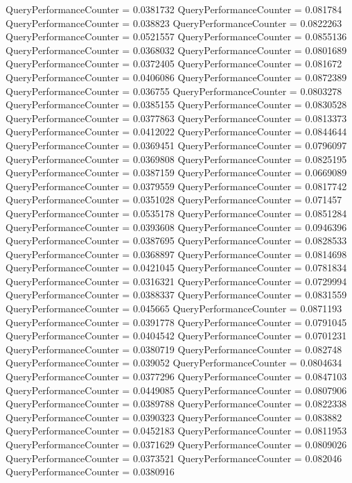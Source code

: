 \documentclass[9pt]{article}
\theoremstyle{plain}
\theoremstyle{definition}
\theoremstyle{remark}
\numberwithin{equation}{section}
\begin{document}
QueryPerformanceCounter  =  0.0381732
QueryPerformanceCounter  =  0.081784
QueryPerformanceCounter  =  0.038823
QueryPerformanceCounter  =  0.0822263
QueryPerformanceCounter  =  0.0521557
QueryPerformanceCounter  =  0.0855136
QueryPerformanceCounter  =  0.0368032
QueryPerformanceCounter  =  0.0801689
QueryPerformanceCounter  =  0.0372405
QueryPerformanceCounter  =  0.081672
QueryPerformanceCounter  =  0.0406086
QueryPerformanceCounter  =  0.0872389
QueryPerformanceCounter  =  0.036755
QueryPerformanceCounter  =  0.0803278
QueryPerformanceCounter  =  0.0385155
QueryPerformanceCounter  =  0.0830528
QueryPerformanceCounter  =  0.0377863
QueryPerformanceCounter  =  0.0813373
QueryPerformanceCounter  =  0.0412022
QueryPerformanceCounter  =  0.0844644
QueryPerformanceCounter  =  0.0369451
QueryPerformanceCounter  =  0.0796097
QueryPerformanceCounter  =  0.0369808
QueryPerformanceCounter  =  0.0825195
QueryPerformanceCounter  =  0.0387159
QueryPerformanceCounter  =  0.0669089
QueryPerformanceCounter  =  0.0379559
QueryPerformanceCounter  =  0.0817742
QueryPerformanceCounter  =  0.0351028
QueryPerformanceCounter  =  0.071457
QueryPerformanceCounter  =  0.0535178
QueryPerformanceCounter  =  0.0851284
QueryPerformanceCounter  =  0.0393608
QueryPerformanceCounter  =  0.0946396
QueryPerformanceCounter  =  0.0387695
QueryPerformanceCounter  =  0.0828533
QueryPerformanceCounter  =  0.0368897
QueryPerformanceCounter  =  0.0814698
QueryPerformanceCounter  =  0.0421045
QueryPerformanceCounter  =  0.0781834
QueryPerformanceCounter  =  0.0316321
QueryPerformanceCounter  =  0.0729994
QueryPerformanceCounter  =  0.0388337
QueryPerformanceCounter  =  0.0831559
QueryPerformanceCounter  =  0.045665
QueryPerformanceCounter  =  0.0871193
QueryPerformanceCounter  =  0.0391778
QueryPerformanceCounter  =  0.0791045
QueryPerformanceCounter  =  0.0404542
QueryPerformanceCounter  =  0.0701231
QueryPerformanceCounter  =  0.0380719
QueryPerformanceCounter  =  0.082748
QueryPerformanceCounter  =  0.039052
QueryPerformanceCounter  =  0.0804634
QueryPerformanceCounter  =  0.0377296
QueryPerformanceCounter  =  0.0847103
QueryPerformanceCounter  =  0.0449085
QueryPerformanceCounter  =  0.0807906
QueryPerformanceCounter  =  0.0389788
QueryPerformanceCounter  =  0.0822338
QueryPerformanceCounter  =  0.0390323
QueryPerformanceCounter  =  0.083882
QueryPerformanceCounter  =  0.0452183
QueryPerformanceCounter  =  0.0811953
QueryPerformanceCounter  =  0.0371629
QueryPerformanceCounter  =  0.0809026
QueryPerformanceCounter  =  0.0373521
QueryPerformanceCounter  =  0.082046
QueryPerformanceCounter  =  0.0380916
\end{document}
